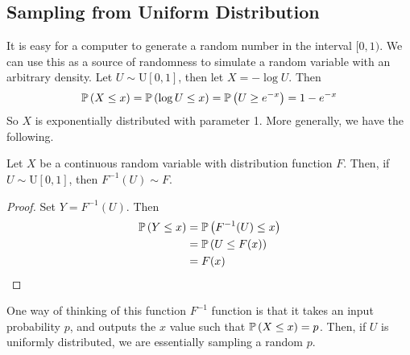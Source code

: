\subsection{Sampling from Uniform Distribution}
It is easy for a computer to generate a random number in the interval $[0, 1)$. We can use this as a source of randomness to simulate a random variable with an arbitrary density. Let $U \sim \mathrm{U}[0, 1]$, then let $X = -\log U$. Then
\[ \mathbb{P}\left({X \leq x}\right) = \mathbb{P}\left({\log U \leq x}\right) = \mathbb{P}\left({U \geq e^{-x}}\right) = 1-e^{-x} \]
So $X$ is exponentially distributed with parameter 1. More generally, we have the following.
\begin{theorem}
    Let $X$ be a continuous random variable with distribution function $F$. Then, if $U \sim \mathrm{U}[0, 1]$, then $F^{-1}(U) \sim F$.
\end{theorem}
\begin{proof}
    Set $Y = F^{-1}(U)$. Then
    \begin{align*}
        \mathbb{P}\left({Y \leq x}\right) &= \mathbb{P}\left({F^{-1}(U) \leq x}\right) \\
        &= \mathbb{P}\left({U \leq F(x)}\right) \\
        &= F(x)
    \end{align*}
\end{proof}
\noindent One way of thinking of this function $F^{-1}$ function is that it takes an input probability $p$, and outputs the $x$ value such that $\mathbb{P}\left({X \leq x}\right) = p$. Then, if $U$ is uniformly distributed, we are essentially sampling a random $p$.

